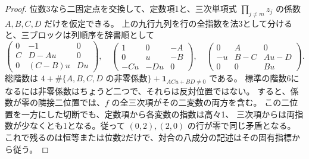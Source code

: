 \begin{proof}
位数3なら二固定点を交換して、定数項1と、三次単項式
$\prod_{j\ne m}z_j$ の係数 $A,B,C,D$ だけを仮定できる。
上の九行九列を行の全指数を法3として分けると、三ブロックは列順序を辞書順として
\[
 \begin{pmatrix}0&-1&0\\ C&D-Au&0\\0&(C-B)u&Du\end{pmatrix},\quad
 \begin{pmatrix}1&0&-A\\0&u&-B\\-Cu&-Du&0\end{pmatrix},\quad
 \begin{pmatrix}0&A&0\\-u&B-C&Au-D\\0&0&Bu\end{pmatrix}.
\]
総階数は $4+\#\{A,B,C,D\text{ の非零係数}\}+\mathbf1_{ACu+BD\ne0}$ である。
標準の階数6になるには非零係数はちょうど二つで、それらは反対位置ではない。
すると、係数が零の隣接二位置では、$f$ の全三次項がその二変数の両方を含む。
この二位置を一方にした切断でも、定数項から各変数の指数は高々1、
三次項からは両指数が少なくとも1となる。従って $(0,2),(2,0)$ の行が零で同じ矛盾となる。
これで残るのは恒等または位数2だけで、対合の八成分の記述はその固有指標から従う。
\end{proof}
